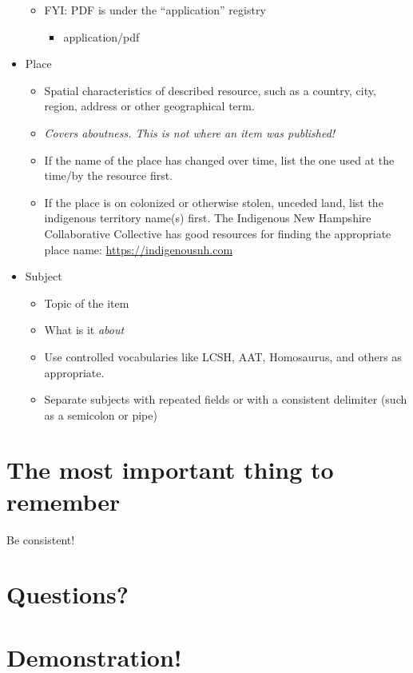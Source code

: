 \documentclass[11pt]{article}
\begin{document}
\begin{itemize}
\begin{itemize}
\item FYI: PDF is under the ``application'' registry
\begin{itemize}
\item application/pdf
\end{itemize}
\end{itemize}
\item Place
\label{sec:org43cdb7f}
\begin{itemize}
\item Spatial characteristics of described resource, such as a country, city, region, address or other geographical term.
\item \emph{Covers aboutness. This is not where an item was published!}
\item If the name of the place has changed over time, list the one used at the time/by the resource first.
\item If the place is on colonized or otherwise stolen, unceded land, list the indigenous territory name(s) first. The Indigenous New Hampshire Collaborative Collective has good resources for finding the appropriate place name: \url{https://indigenousnh.com}
\end{itemize}
\item Subject
\label{sec:org89eb740}
\begin{itemize}
\item Topic of the item
\item What is it \emph{about}
\item Use controlled vocabularies like LCSH, AAT, Homosaurus, and others as appropriate.
\item Separate subjects with repeated fields or with a consistent delimiter (such as a semicolon or pipe)
\end{itemize}
\end{itemize}

\section*{The most important thing to remember}
\label{sec:org9ece041}

Be consistent!

\section*{Questions?}
\label{sec:org79e3075}
\section*{Demonstration!}
\label{sec:org49d268a}
\end{document}
